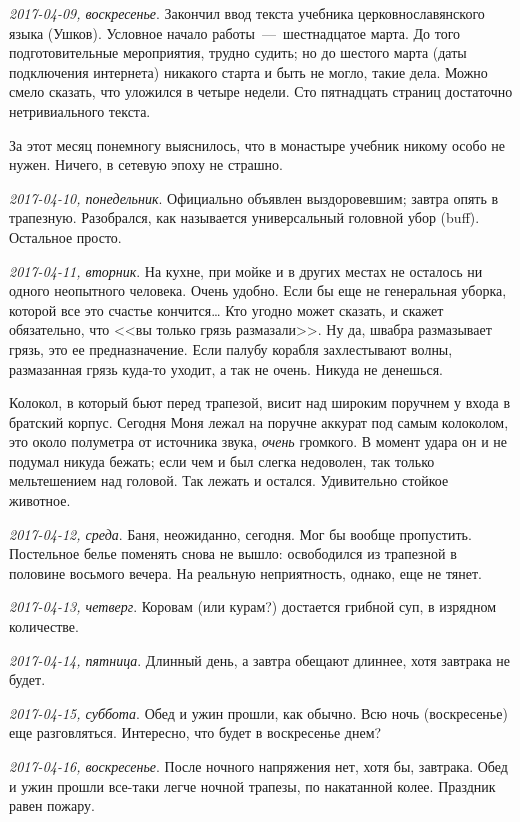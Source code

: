 \documentclass[
    12pt
    ,a4paper
    ,oneside
    ,russian
]{memoir}
\newcommand{\mydatestamp}{
    \bigskip   %
    \emph
}
\newcommand{\mds}{\mydatestamp}
\begin{document}
    \mds{2017-04-09, воскресенье}. Закончил ввод текста учебника церковнославянского языка (Ушков). Условное начало работы~---~шестнадцатое марта. До того подготовительные мероприятия, трудно судить; но до шестого марта (даты подключения интернета) никакого старта и быть не могло, такие дела. Можно смело сказать, что уложился в четыре недели. Сто пятнадцать страниц достаточно нетривиального текста.
    
    За этот месяц понемногу выяснилось, что в монастыре учебник никому особо не нужен. Ничего, в сетевую эпоху не страшно.
    
    \mds{2017-04-10, понедельник}. Официально объявлен выздоровевшим; завтра опять в трапезную. Разобрался, как называется универсальный головной убор (buff). Остальное просто.
    
    \mds{2017-04-11, вторник}. На кухне, при мойке и в других местах не осталось ни одного неопытного человека. Очень удобно. Если бы еще не генеральная уборка, которой все это счастье кончится\ldots{} Кто угодно может сказать, и скажет обязательно, что <<вы только грязь размазали>>. Ну да, швабра размазывает грязь, это ее предназначение. Если палубу корабля захлестывают волны, размазанная грязь куда-то уходит, а так не очень. Никуда не денешься.
    
    Колокол, в который бьют перед трапезой, висит над широким поручнем у входа в братский корпус. Сегодня Моня лежал на поручне аккурат под самым колоколом, это около полуметра от источника звука, \emph{очень} громкого. В момент удара он и не подумал никуда бежать; если чем и был слегка недоволен, так только мельтешением над головой. Так лежать и остался. Удивительно стойкое животное.
    
    \mds{2017-04-12, среда}. Баня, неожиданно, сегодня. Мог бы вообще пропустить. Постельное белье поменять снова не вышло: освободился из трапезной в половине восьмого вечера. На реальную неприятность, однако, еще не тянет.
    
    \mds{2017-04-13, четверг}. Коровам (или курам?) достается грибной суп, в изрядном количестве.
    
    \mds{2017-04-14, пятница}. Длинный день, а завтра обещают длиннее, хотя завтрака не будет.
    
    \mds{2017-04-15, суббота}. Обед и ужин прошли, как обычно. Всю ночь (воскресенье) еще разговляться. Интересно, что будет в воскресенье днем?
    
    \mds{2017-04-16, воскресенье}. После ночного напряжения нет, хотя бы, завтрака. Обед и ужин прошли все-таки легче ночной трапезы, по накатанной колее. Праздник равен пожару.
    
\end{document}
